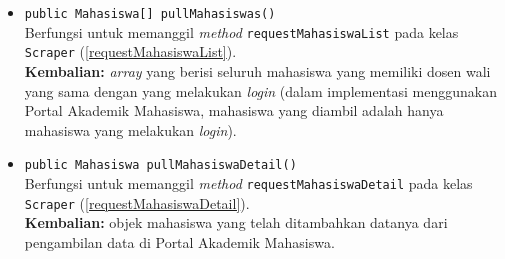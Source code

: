 \begin{enumerate}
\begin{itemize}
		\item \texttt{public Mahasiswa[] pullMahasiswas()}\\
	    Berfungsi untuk memanggil \textit{method} \texttt{requestMahasiswaList} pada kelas \texttt{Scraper} (\ref{requestMahasiswaList}).\\
		\textbf{Kembalian:} \textit{array} yang berisi seluruh mahasiswa yang memiliki dosen wali yang sama dengan yang melakukan \textit{login} (dalam implementasi menggunakan Portal Akademik Mahasiswa, mahasiswa yang diambil adalah hanya mahasiswa yang melakukan \textit{login}).
		
		\item \texttt{public Mahasiswa pullMahasiswaDetail()}\\
	    Berfungsi untuk memanggil \textit{method} \texttt{requestMahasiswaDetail} pada kelas \texttt{Scraper} (\ref{requestMahasiswaDetail}).\\
		\textbf{Kembalian:} objek mahasiswa yang telah ditambahkan datanya dari pengambilan data di Portal Akademik Mahasiswa.
	\end{itemize}


\end{enumerate}

